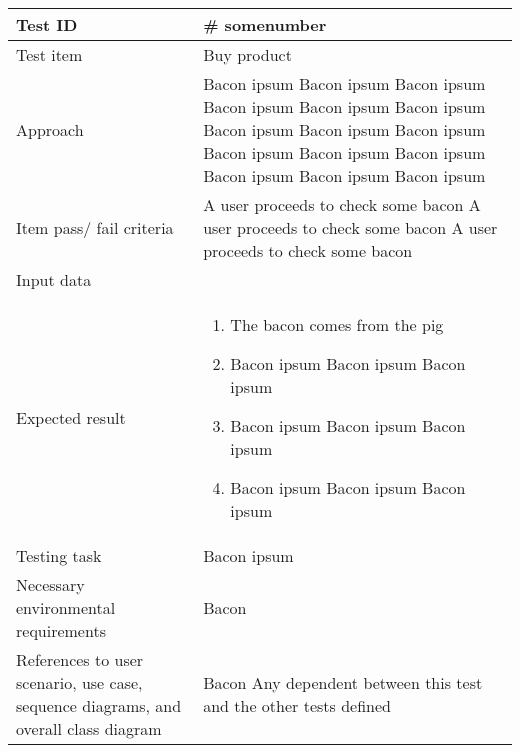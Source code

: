 \documentclass[a4paper, 10pt]{article}
\begin{document}
\begin{tabularx}{\textwidth}{ |X|X| }
\hline
\rowcolor{Gray}
Test ID & \# somenumber \\ \hline
Test item & Buy product \\ \hline
Approach & Bacon ipsum Bacon ipsum Bacon ipsum Bacon ipsum Bacon ipsum Bacon ipsum Bacon ipsum Bacon ipsum Bacon ipsum Bacon ipsum Bacon ipsum Bacon ipsum Bacon ipsum Bacon ipsum Bacon ipsum \\ \hline
Item pass/ fail criteria & A user proceeds to check some bacon A user proceeds to check some bacon A user proceeds to check some bacon\\ \hline
Input data & 
\begin*{itemize}
	\item bacon
	\item pork
\end{itemize}\\ \hline
Expected result & 
\begin{enumerate}
	\item The bacon comes from the pig
	\item Bacon ipsum Bacon ipsum Bacon ipsum 
	\item Bacon ipsum Bacon ipsum Bacon ipsum 
	\item Bacon ipsum Bacon ipsum Bacon ipsum 
\end{enumerate} \\ \hline
Testing task & Bacon ipsum \\ \hline
Necessary environmental requirements & Bacon  \\ \hline
References to user scenario, use case, sequence diagrams, and overall class diagram & Bacon
Any dependent between this test and the other tests defined   \\ \hline


\end{tabularx}
\subse
\end{document}
